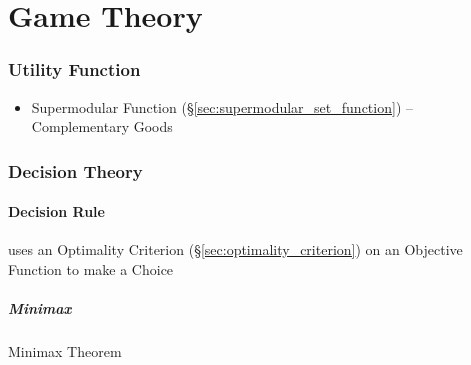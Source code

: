 \part{Game Theory}\label{sec:game_theory}

\section{Utility Function}\label{sec:utility_function}

\begin{itemize}
  \item Supermodular Function (\S\ref{sec:supermodular_set_function}) --
    Complementary Goods
\end{itemize}



\section{Decision Theory}\label{sec:decision_theory}

\subsection{Decision Rule}\label{sec:decision_rule}

uses an Optimality Criterion (\S\ref{sec:optimality_criterion}) on an Objective
Function to make a Choice



\subsubsection{Minimax}\label{sec:minimax}

Minimax Theorem



